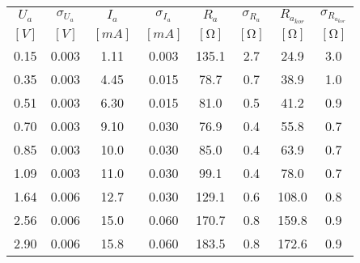\begin{tabular}{cccccccc}                                                                                                                   \toprule
$U_a$      & $\sigma_{U_a}$  & $I_a$       & $\sigma_{I_a}$ & $R_a$         & $\sigma_{R_a}$ & $R_{a_{kor}}$ & $\sigma_{R_{a_{kor}}}$   \\
$[\si{V}]$ & $[\si{V}]$      & $[\si{mA}]$ & $[\si{mA}]$    & $[\si{\ohm}]$ & $[\si{\ohm}]$  & $[\si{\ohm}]$ & $[\si{\ohm}]$            \\  \midrule

0.15       & 0.003           & 1.11        &    0.003       & 135.1         & 2.7            & 24.9          & 3.0                      \\                                                                  
0.35       & 0.003           & 4.45        &    0.015       & 78.7          & 0.7            & 38.9          & 1.0                      \\                                                                  
0.51       & 0.003           & 6.30        &    0.015       & 81.0          & 0.5            & 41.2          & 0.9                      \\                                                                  
0.70       & 0.003           & 9.10        &    0.030       & 76.9          & 0.4            & 55.8          & 0.7                      \\                                                                  
0.85       & 0.003           & 10.0        &    0.030       & 85.0          & 0.4            & 63.9          & 0.7                      \\                                                                  
1.09       & 0.003           & 11.0        &    0.030       & 99.1          & 0.4            & 78.0          & 0.7                      \\                                                                  
1.64       & 0.006           & 12.7        &    0.030       & 129.1         & 0.6            & 108.0         & 0.8                      \\                                                                  
2.56       & 0.006           & 15.0        &    0.060       & 170.7         & 0.8            & 159.8         & 0.9                      \\                                                                  
2.90       & 0.006           & 15.8        &    0.060       & 183.5         & 0.8            & 172.6         & 0.9                      \\                                                                  

\end{tabular}
